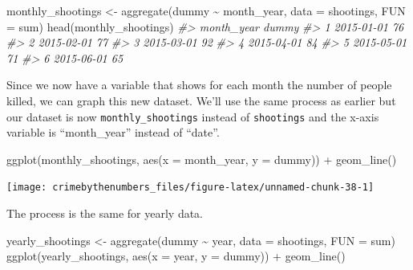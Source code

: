 \documentclass[
  12pt,
]{book}
\newenvironment{Shaded}{\begin{snugshade}}{\end{snugshade}}
\newcommand{\AttributeTok}[1]{\textcolor[rgb]{0.61,0.61,0.61}{#1}}
\newcommand{\CommentTok}[1]{\textcolor[rgb]{0.37,0.37,0.37}{\textit{#1}}}
\newcommand{\FunctionTok}[1]{\textcolor[rgb]{0,0,0}{#1}}
\newcommand{\NormalTok}[1]{#1}
\newcommand{\OtherTok}[1]{\textcolor[rgb]{0.37,0.37,0.37}{#1}}
\newcommand{\SpecialCharTok}[1]{\textcolor[rgb]{0,0,0}{#1}}
\begin{document}
\begin{Shaded}
\begin{Highlighting}[]
\NormalTok{monthly\_shootings }\OtherTok{\textless{}{-}} \FunctionTok{aggregate}\NormalTok{(dummy }\SpecialCharTok{\textasciitilde{}}\NormalTok{ month\_year, }\AttributeTok{data =}\NormalTok{ shootings, }\AttributeTok{FUN =}\NormalTok{ sum)}
\FunctionTok{head}\NormalTok{(monthly\_shootings)}
\CommentTok{\#\textgreater{}   month\_year dummy}
\CommentTok{\#\textgreater{} 1 2015{-}01{-}01    76}
\CommentTok{\#\textgreater{} 2 2015{-}02{-}01    77}
\CommentTok{\#\textgreater{} 3 2015{-}03{-}01    92}
\CommentTok{\#\textgreater{} 4 2015{-}04{-}01    84}
\CommentTok{\#\textgreater{} 5 2015{-}05{-}01    71}
\CommentTok{\#\textgreater{} 6 2015{-}06{-}01    65}
\end{Highlighting}
\end{Shaded}

Since we now have a variable that shows for each month the number of people killed, we can graph this new dataset. We'll use the same process as earlier but our dataset is now \texttt{monthly\_shootings} instead of \texttt{shootings} and the x-axis variable is ``month\_year'' instead of ``date''.

\begin{Shaded}
\begin{Highlighting}[]
\FunctionTok{ggplot}\NormalTok{(monthly\_shootings, }\FunctionTok{aes}\NormalTok{(}\AttributeTok{x =}\NormalTok{ month\_year, }\AttributeTok{y =}\NormalTok{ dummy)) }\SpecialCharTok{+}
  \FunctionTok{geom\_line}\NormalTok{()}
\end{Highlighting}
\end{Shaded}

\begin{center}\texttt{[image: crimebythenumbers\_files/figure-latex/unnamed-chunk-38-1]} \end{center}

The process is the same for yearly data.

\begin{Shaded}
\begin{Highlighting}[]
\NormalTok{yearly\_shootings }\OtherTok{\textless{}{-}} \FunctionTok{aggregate}\NormalTok{(dummy }\SpecialCharTok{\textasciitilde{}}\NormalTok{ year, }\AttributeTok{data =}\NormalTok{ shootings, }\AttributeTok{FUN =}\NormalTok{ sum)}
\FunctionTok{ggplot}\NormalTok{(yearly\_shootings, }\FunctionTok{aes}\NormalTok{(}\AttributeTok{x =}\NormalTok{ year, }\AttributeTok{y =}\NormalTok{ dummy)) }\SpecialCharTok{+}
  \FunctionTok{geom\_line}\NormalTok{()}
\end{Highlighting}
\end{Shaded}
\end{document}

